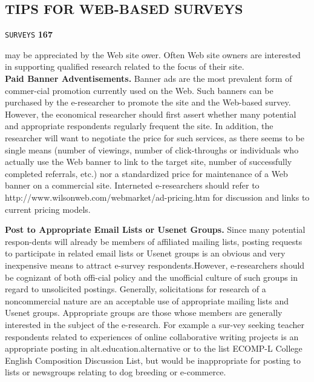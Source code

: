 \documentclass[a4,9pt]{beamer}
\begin{document}
\begin{frame}
\section*{TIPS FOR WEB-BASED SURVEYS}
\begin{flushright}
 \texttt{SURVEYS} \hspace*{1cm} \textbf{167}
\end{flushright}

\vspace*{0.5cm}
may be appreciated by the Web site ower. Often Web site owners are interested in supporting qualified research related to the focus of their site.\\

 \vspace*{0.4cm}
 \textbf{Paid Banner Adventisements. }  \hspace*{0.2cm} Banner ads are the most prevalent form of commer-cial promotion currently used on the Web. Such banners can be purchased by the e-researcher to promote the site and the Web-based survey. However, the economical researcher should first assert whether many potential and appropriate respondents regularly frequent the site. In addition, the researcher will want to negotiate the price for such services, as there seems to be single means (number of viewings, number of click-throughs or individuals who actually use the Web banner to link to the target site, number of successfully completed referrals, etc.) nor a standardized price for maintenance of a Web banner on a commercial site. Interneted e-researchers should refer to http://www.wilsonweb.com/webmarket/ad-pricing.htm for discussion and links to current pricing models.\\

  \vspace*{0.4cm}
\end{frame}

\begin{frame}
\textbf{Post to Appropriate Email Lists or Usenet Groups.}  \hspace*{0.2cm} Since many potential respon-dents will already be members of affiliated mailing lists, posting requests to participate in related email lists or Usenet groups is an obvious and very inexpensive means to attract e-survey respondents.However, e-researchers should be cognizant of both offi-cial policy and the unofficial culture of such groups in regard to unsolicited postings.
Generally, solicitations for research of a noncommercial nature are an acceptable use of appropriate mailing lists and Usenet groups. Appropriate groups are those whose members are generally interested in the subject of the e-research. For example a sur-vey seeking teacher respondents related to experiences of online collaborative writing projects is an appropriate posting in alt.education.alternative or to the list ECOMP-L College English Composition Discussion List, but would be inappropriate for posting to lists or newsgroups relating to dog breeding or e-commerce.\\

   \vspace*{0.4cm}
\end{frame}
\end{document}
